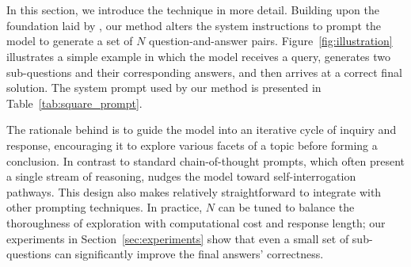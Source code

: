 \section{\rephrase}
\label{sec:phrasing}

In this section, we introduce the \rephrase{} technique in more detail. Building upon the foundation laid by \citet{dengRephraseRespondLet2024}, our method alters the system instructions to prompt the model to generate a set of $N$ question-and-answer pairs. Figure~\ref{fig:illustration} illustrates a simple example in which the model receives a query, generates two sub-questions and their corresponding answers, and then arrives at a correct final solution. The system prompt used by our method is presented in Table~\ref{tab:square_prompt}.

The rationale behind \rephrase{} is to guide the model into an iterative cycle of inquiry and response, encouraging it to explore various facets of a topic before forming a conclusion. In contrast to standard chain-of-thought prompts, which often present a single stream of reasoning, \rephrase{} nudges the model toward self-interrogation pathways. This design also makes \rephrase{} relatively straightforward to integrate with other prompting techniques. In practice, $N$ can be tuned to balance the thoroughness of exploration with computational cost and response length; our experiments in Section~\ref{sec:experiments} show that even a small set of sub-questions can significantly improve the final answers' correctness.

